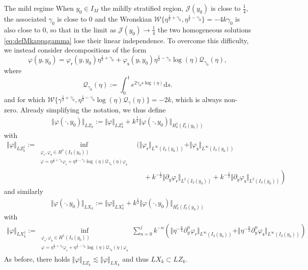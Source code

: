 \documentclass[11pt,reqno]{amsproc}
\makeatletter
\renewcommand\subsubsection{\@startsection{subsubsection}{3}%
\normalparindent{.5\linespacing\@plus.7\linespacing}{-.5em}
{\normalfont\bfseries}}
\theoremstyle{definition}
\numberwithin{equation}{section}
\newcommand{\cJ}{{\mathcal{J}}}
\newcommand{\Q}{{\mathcal{Q}}}
\newcommand{\sr}{{\mathsf{r}}}
\newcommand{\s}{{\mathsf{s}}}
\newcommand{\W}{{\mathcal{W}}}
\renewcommand{\d}{\mathrm{d}}
\makeatother
\begin{document}
\subsubsection{The mild regime}
When $y_0\in I_M$ the mildly stratified region, $\cJ(y_0)$ is close to $\frac14$, the associated $\gamma_0$ is close to  $0$ and the Wronskian $\W\lbrace\eta^{\frac12+\gamma_0}, \eta^{\frac12-\gamma_0}\rbrace = -4k\gamma_0$ is also close to $0$, so that in the limit as $\cJ(y_0)\rightarrow\frac14$ the two homogeneous solutions  \eqref{eq:defMkappagamma} lose their linear independence. To overcome this difficulty, we instead consider decompositions of the form
\begin{equation}\label{eq:decomlogvarphi}
\varphi(y,y_0) = \varphi_\sr(y,y_0)\eta^{\frac12 +\gamma_0} + \varphi_\s(y,y_0)\eta^{\frac12-\gamma_0}\log(\eta)\Q_{\gamma_0}(\eta),
\end{equation}
where 
\begin{equation}\label{eq:defQgamma}
\Q_{\gamma_0}(\eta) := \int_0^1 e^{2\gamma_0 s \log(\eta)} \d s.
\end{equation}
and for which $\mathcal{W}\lbrace \gamma^{\frac12+\gamma_0}, \eta^{\frac12-\gamma_0}\log(\eta)\mathcal{Q}_{\gamma}(\eta) \rbrace = -2k$, which is always non-zero. Already simplifying the notation, we thus define
\begin{align*}
\Vert \varphi(\cdot, y_0) \Vert_{LZ_k} := \Vert \varphi \Vert_{LZ_k^1}  + k^\frac12\Vert \varphi(\cdot, y_0) \Vert_{H^1_k(I_3^c(y_0))} 
\end{align*}
with
\begin{align*}
\Vert \varphi \Vert_{LZ_k^j}:=\inf_{\substack{\varphi_\sr, \varphi_\s \in H^1(I_3(y_0)) \\  \varphi = \eta^{\frac12+\gamma_0}\varphi_\sr + \eta^{\frac12-\gamma_0}\log(\eta) \Q_{\gamma_0}(\eta)\varphi_\s }} & \Big( \Vert \varphi_\sr\Vert_{L^{\infty}(I_3(y_0))} + \Vert  \varphi_\s\Vert_{L^{\infty}(I_3(y_0))}  \\
&\quad + \left. k^{-\frac12}\Vert \partial_y\varphi_\sr\Vert_{L^{2}(I_3(y_0))} + k^{-\frac12}\Vert  \partial_y\varphi_\s\Vert_{L^{2}(I_3(y_0))} \right)
\end{align*}
and similarly
\begin{align*}
\Vert \varphi(\cdot, y_0) \Vert_{LX_k} := \Vert \varphi \Vert_{LX_k^1}  + k^\frac12\Vert \varphi(\cdot, y_0) \Vert_{H^1_k(I_3^c(y_0))} 
\end{align*}
with
\begin{align*}
\Vert \varphi \Vert_{LX_k^j}:= \inf_{\substack{\varphi_\sr, \varphi_\s \in H^1(I_3(y_0)) \\  \varphi = \eta^{\frac12+\gamma_0}\varphi_\sr + \eta^{\frac12-\gamma_0}\log(\eta) \Q_{\gamma_0}(\eta)\varphi_\s }}\sum_{n=0}^j k^{-n} \left( \Vert \eta^{-\frac{n}{2}}\partial_y^n\varphi_\sr\Vert_{L^{\infty}(I_3(y_0))} + \Vert \eta^{-\frac{n}{2}}  \partial_y^n\varphi_\s\Vert_{L^{\infty}(I_3(y_0))} \right)
\end{align*}
As before, there holds $\Vert \varphi \Vert_{LZ_k} \lesssim \Vert \varphi \Vert_{LX_k}$ and thus $LX_k \subset LZ_k$.
\end{document}
